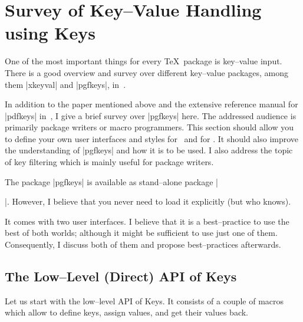 \documentclass[a4paper]{ltxdoc}
\begin{document}
\section{Survey of Key--Value Handling using \PGF Keys}

One of the most important things for every \TeX\ package is key--value input. There is a good overview and survey over different key--value packages, among them |xkeyval| and |pgfkeys|, in~\cite{keyvalintro}. 

In addition to the paper mentioned above and the extensive reference manual for |pdfkeys| in~\cite{tikz}, I give a brief survey over |pgfkeys| here. The addressed audience is primarily package writers or macro programmers. This section should allow you to define your own user interfaces and styles for \PGFPlots\ and for \PGF. It should also improve the understanding of |pgfkeys| and how it is to be used. I also address the topic of key filtering which is mainly useful for package writers.

The package |pgfkeys| is available as stand--alone package |\usepackage{pgfkeys}|. However, I believe that you never need to load it explicitly (but who knows).

It comes with two user interfaces. I believe that it is a best--practice to use the best of both worlds; although it might be sufficient to use just one of them. Consequently, I discuss both of them and propose best--practices afterwards.

\subsection{The Low--Level (Direct) API of \PGF Keys}
Let us start with the low--level API of \PGF Keys. It consists of a couple of macros which allow to define keys, assign values, and get their values back.
\end{document}
